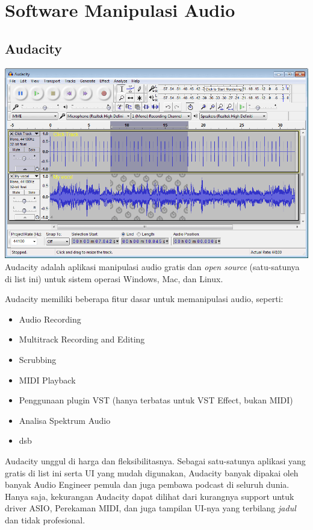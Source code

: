 \hypertarget{software-manipulasi-audio}{%
\section{Software Manipulasi Audio}\label{software-manipulasi-audio}}

\hypertarget{audacity}{%
\subsection{Audacity}\label{audacity}}

\includegraphics{images/audacity.png} Audacity adalah aplikasi
manipulasi audio gratis dan \emph{open source} (satu-satunya di list
ini) untuk sistem operasi Windows, Mac, dan Linux.

Audacity memiliki beberapa fitur dasar untuk memanipulasi audio,
seperti:

\begin{itemize}
\tightlist
\item
  Audio Recording
\item
  Multitrack Recording and Editing
\item
  Scrubbing
\item
  MIDI Playback
\item
  Penggunaan plugin VST (hanya terbatas untuk VST Effect, bukan MIDI)
\item
  Analisa Spektrum Audio
\item
  dsb
\end{itemize}

Audacity unggul di harga dan fleksibilitasnya. Sebagai satu-satunya
aplikasi yang gratis di list ini serta UI yang mudah digunakan, Audacity
banyak dipakai oleh banyak Audio Engineer pemula dan juga pembawa
podcast di seluruh dunia. Hanya saja, kekurangan Audacity dapat dilihat
dari kurangnya support untuk driver ASIO, Perekaman MIDI, dan juga
tampilan UI-nya yang terbilang \emph{jadul} dan tidak profesional.

